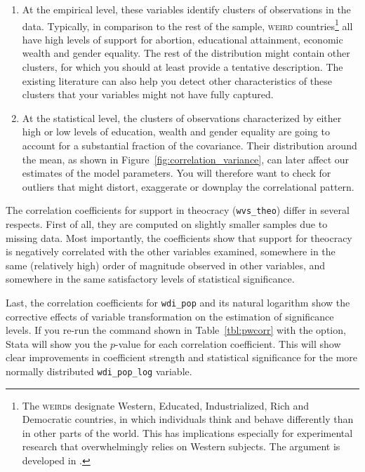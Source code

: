 \begin{enumerate}
	\item At the empirical level, these variables identify clusters of observations in the data. Typically, in comparison to the rest of the sample, \textsc{weird} countries\footnote{The \textsc{weird}s designate Western, Educated, Industrialized, Rich and Democratic countries, in which individuals think and behave differently than in other parts of the world. This has implications especially for experimental research that overwhelmingly relies on Western subjects. The argument is developed in \cite{HenrichHeine:2010a}.} all have high levels of support for abortion, educational attainment, economic wealth and gender equality. The rest of the distribution might contain other clusters, for which you should at least provide a tentative description. The existing literature can also help you detect other characteristics of these clusters that your variables might not have fully captured.

	\item At the statistical level, the clusters of observations characterized by either high or low levels of education, wealth and gender equality are going to account for a substantial fraction of the covariance. Their distribution around the mean, as shown in Figure~\ref{fig:correlation_variance}, can later affect our estimates of the model parameters. You will therefore want to check for outliers that might distort, exaggerate or downplay the correlational pattern.
\end{enumerate}

The correlation coefficients for support in theocracy (\texttt{wvs\_theo}) differ in several respects. First of all, they are computed on slightly smaller samples due to missing data. Most importantly, the coefficients show that support for theocracy is negatively correlated with the other variables examined, somewhere in the same (relatively high) order of magnitude observed in other variables, and somewhere in the same satisfactory levels of statistical significance.

Last, the correlation coefficients for \texttt{wdi\_pop} and its natural logarithm show the corrective effects of variable transformation on the estimation of significance levels. If you re-run the  command shown in Table~\ref{tbl:pwcorr} with the  option, Stata will show you the $p$-value for each correlation coefficient. This will show clear improvements in coefficient strength and statistical significance for the more normally distributed \texttt{wdi\_pop\_log} variable.

